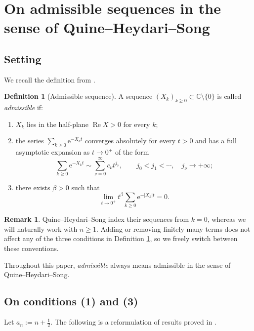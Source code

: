 \documentclass[11pt,letterpaper]{amsart}
\numberwithin{equation}{section}
\theoremstyle{definition}
\newtheorem{definition}[theorem]{Definition}
\newtheorem{remark}[theorem]{Remark}
\newcommand{\C}{\mathbb{C}}
\newcommand{\Ree}{\operatorname{Re}}
\newcommand{\e}{\mathrm{e}}
\begin{document}
\section{On admissible sequences in the sense of Quine--Heydari--Song}\label{sec:QHS}

\subsection{Setting}

We recall the definition from \cite[\S2]{QHS}.

\begin{definition}[Admissible sequence]\label{def:admissible}
A sequence $(X_k)_{k\ge 0}\subset \C\setminus\{0\}$ is called \emph{admissible} if:
\begin{enumerate}[label=\textup{(\arabic*)},leftmargin=2.5em]
\item $X_k$ lies in the half-plane $\Ree X>0$ for every $k$;
\item the series $\sum_{k\ge 0}\e^{-X_k t}$ converges absolutely for every $t>0$ and has
a full asymptotic expansion as $t\to 0^+$ of the form
\[
\sum_{k\ge 0}\e^{-X_k t}\sim \sum_{\nu=0}^\infty c_\nu t^{j_\nu},
\qquad j_0<j_1<\cdots,\quad j_\nu\to+\infty;
\]
\item there exists $\beta>0$ such that
\[
\lim_{t\to 0^+} t^\beta \sum_{k\ge 0}\e^{-|X_k|t} = 0.
\]
\end{enumerate}
\end{definition}

\begin{remark}
Quine--Heydari--Song index their sequences from $k=0$, whereas we will naturally work with
$n\ge 1$. Adding or removing finitely many terms does not affect any of the three conditions
in Definition \ref{def:admissible}, so we freely switch between these conventions.
\end{remark}

Throughout this paper, \emph{admissible} always means admissible in the sense of Quine--Heydari--Song.


\subsection{On conditions (1) and (3)}

Let $a_n:=n+\tfrac12$. The following is a reformulation of results proved in
\cite[Theorem~6.1 and Theorem~1.2]{BOCRS}.
\end{document}
